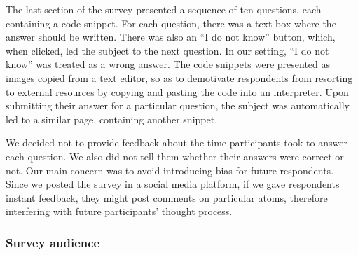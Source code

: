 The last section of the survey presented a sequence of ten questions, each containing a code snippet. For each question, there was a text box where the answer should be written. There was also an ``I do not know'' button, which, when clicked, led the subject to the next question. In our setting, ``I do not know'' was treated as a wrong answer. The code snippets were presented as images copied from a text editor, so as to demotivate respondents from resorting to external resources by copying and pasting the code into an interpreter. Upon submitting their answer for a particular question, the subject was automatically led to a similar page, containing another snippet.

We decided not to provide feedback about the time participants took to answer each question. We also did not tell them whether their answers were correct or not. Our main concern was to avoid introducing bias for future respondents. Since we posted the survey in a social media platform, if we gave respondents instant feedback, they might post comments on particular atoms, therefore interfering with future participants' thought process.



\subsubsection*{Survey audience}


